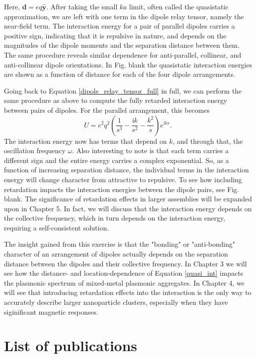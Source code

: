 \documentclass [11pt, proquest] {uwthesis}[2016/11/22]
\begin{document}
Here, $\textbf{d}=eq\hat{\textbf{y}}$. After taking the small $ka$ limit, often called the quasistatic approximation, we are left with one term in the dipole relay tensor, namely the near-field term. The interaction energy for a pair of parallel dipoles carries a positive sign, indicating that it is repulsive in nature, and depends on the magnitudes of the dipole moments and the separation distance between them. The same procedure reveals similar dependence for anti-parallel, collinear, and anti-collinear dipole orientations. In Fig. blank the quasistatic interaction energies are shown as a function of distance for each of the four dipole arrangements.

Going back to Equation \ref{dipole_relay_tensor_full} in full, we can perform the same procedure as above to compute the fully retarded interaction energy between pairs of dipoles. For the parallel arrangement, this becomes
\begin{equation}
U = e^2q^2\left(\frac{1}{s^3}-\frac{\textrm{i}k}{s^2}-\frac{k^2}{s}\right)e^{\textrm{i}ks}.
\label{int_ret}
\end{equation}
The interaction energy now has terms that depend on $k$, and through that, the oscillation frequency $\omega$. Also interesting to note is that each term carries a different sign and the entire energy carries a complex exponential. So, as a function of increasing separation distance, the individual terms in the interaction energy will change character from attractive to repulsive. To see how including retardation impacts the interaction energies between the dipole pairs, see Fig. blank. The significance of retardation effects in larger assemblies will be expanded upon in Chapter 5. In fact, we will discuss that the interaction energy depends on the collective frequency, which in turn depends on the interaction energy, requiring a self-consistent solution.

The insight gained from this exercise is that the "bonding" or "anti-bonding" character of an arrangement of dipoles actually depends on the separation distance between the dipoles and their collective frequency. In Chapter 3 we will see how the distance- and location-dependence of Equation \ref{quasi_int} impacts the plasmonic spectrum of mixed-metal plasmonic aggregates. In Chapter 4, we will see that introducing retardation effects into the interaction is the only way to accurately describe larger nanoparticle clusters, especially when they have siginificant magnetic responses.

\section{List of publications}
\end{document}
